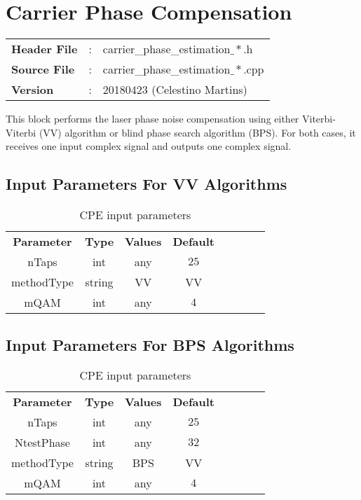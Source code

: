\clearpage

\section{Carrier Phase Compensation}

\begin{tcolorbox}	
	\begin{tabular}{p{2.75cm} p{0.2cm} p{10.5cm}} 	
		\textbf{Header File}   &:& carrier\_phase\_estimation$\_*$.h \\
		\textbf{Source File}   &:& carrier\_phase\_estimation$\_*$.cpp \\
        \textbf{Version}       &:& 20180423 (Celestino Martins) \\
	\end{tabular}
\end{tcolorbox}

This block performs the laser phase noise compensation using either Viterbi-Viterbi (VV) algorithm or blind phase search algorithm (BPS). For both cases, it receives one input complex signal and outputs one complex signal.

\subsection*{Input Parameters For VV Algorithms}

\begin{table}[h]
	\centering
	\begin{tabular}{|c|c|c|c|cccc}
		\cline{1-4}
		\textbf{Parameter} & \textbf{Type} & \textbf{Values} &   \textbf{Default}& \\ \cline{1-4}
		nTaps              & int & any & $25$ \\ \cline{1-4}
        methodType         & string & VV & VV \\ \cline{1-4}
		mQAM                  & int & any & $4$ \\ \cline{1-4}		
	\end{tabular}
	\caption{CPE input parameters}
	\label{table:cpe_in_par_vv}
\end{table}


\subsection*{Input Parameters For BPS Algorithms}

\begin{table}[h]
	\centering
	\begin{tabular}{|c|c|c|c|cccc}
		\cline{1-4}
		\textbf{Parameter} & \textbf{Type} & \textbf{Values} &   \textbf{Default}& \\ \cline{1-4}
		nTaps              & int & any & $25$ \\ \cline{1-4}
        NtestPhase         & int & any & $32$ \\ \cline{1-4}
        methodType         & string & BPS & VV \\ \cline{1-4}
		mQAM                  & int & any & $4$ \\ \cline{1-4}	
	\end{tabular}
	\caption{CPE input parameters}
	\label{table:cpe_in_par_bps}
\end{table}

